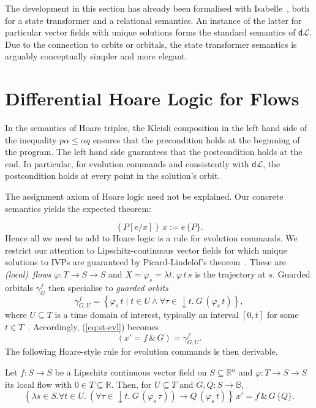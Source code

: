 \documentclass[envcountsame,envcountsect]{llncs}
\newcommand{\dL}{\mathsf{d}\mathcal{L}}
\newcommand{\flow}{\varphi}
\newcommand{\reals}{\mathbb{R}}
\newcommand{\bools}{\mathbb{B}}
\begin{document}
The development in this section has already been formalised with
Isabelle~\cite{afp:hybrid}, both for a state transformer and a
relational semantics. An instance of the latter for particular vector
fields with unique solutions forms the standard semantics of
$\dL$. Due to the connection to orbits or orbitals, the state
transformer semantics is arguably conceptually simpler and more
elegant.



\section{Differential Hoare Logic for Flows}\label{sec:hoare-flow}

In the semantics of Hoare triples, the Kleisli composition in the left hand side of the inequality $p\alpha\le \alpha q$ ensures that the precondition holds at the beginning of the program. The left hand side guarantees that the postcondition holds at the end. In particular, for evolution commands and consistently with $\dL$, the postcondition holds at every point in the solution's orbit.

The assignment axiom of Hoare logic need not be explained. Our concrete
semantics yields the expected theorem:

\begin{equation}
\left\{P[e/x]\right\}\,  x:=e\, \{P\}. \label{eq:h-assgn}\tag{h-assgn}
\end{equation}
Hence all we need to add to Hoare logic is a rule for evolution
commands.  We restrict our attention to Lipschitz-continuous vector
fields for which unique solutions to IVPs are guaranteed by
Picard-Lindel\"of's theorem~\cite{Teschl12}.  These are \emph{(local)\
  flows} $\flow:T\to S\to S$ and $X=\flow_s=\lambda t.\ \flow\, t\, s$
is the trajectory at $s$. Guarded orbitals $\gamma^f_G$ then
specialise to \emph{guarded orbits}
\begin{equation*}
  \gamma^f_{G,U} = \left\{\flow_s\, t\mid t\in U\land \forall\tau \in
  {\downarrow}t.\ G\, (\flow_s\, t)\right\},
\end{equation*}
where $U\subseteq T$ is a time domain of interest, typically an
interval $[0,t]$ for some $t\in T$~\cite{MuniveS19}.  Accordingly,
(\ref{eq:st-evl}) becomes
\begin{equation}
  \left(x' = f\, \&\, G\right)= \gamma^f_{G,U}.\label{eq:st-evl-flow}\tag{st-evl-flow}
\end{equation}
The following Hoare-style rule for evolution commands is then
derivable.
\begin{lemma}\label{P:h-evl-lemma}
  Let $f:S\to S$ be a Lipschitz continuous vector field on
  $S\subseteq \reals^n$ and $\flow:T\to S\to S$ its local flow with
  $0\in T\subseteq \reals$. Then, for $U\subseteq T$ and
  $G,Q:S\to\bools$,
\begin{equation}
\left\{\lambda s\in S.\forall t\in U.\ \left(\forall
\tau\in {\downarrow}t.\ G\, (\flow_s\, \tau)\right) \rightarrow Q\,
(\flow_s\, t)\right\}\, x' = f\, \&\, G\, \{Q\}. \label{eq:h-evl}\tag{h-evl}
\end{equation}
\end{lemma}
\end{document}

